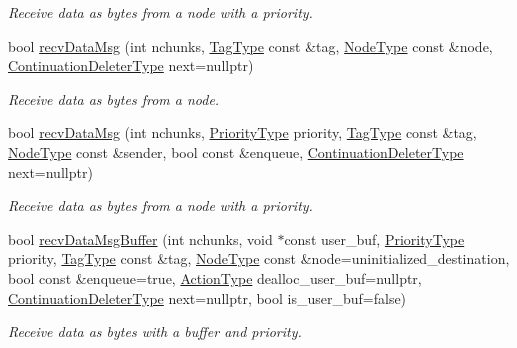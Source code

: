\begin{DoxyCompactItemize}
\begin{DoxyCompactList}\small\item\em Receive data as bytes from a node with a priority. \end{DoxyCompactList}\item 
bool \hyperlink{structvt_1_1messaging_1_1_active_messenger_a9dc244ad2e4fbb24a7bb0b0cd2ef0b61}{recv\+Data\+Msg} (int nchunks, \hyperlink{namespacevt_a84ab281dae04a52a4b243d6bf62d0e52}{Tag\+Type} const \&tag, \hyperlink{namespacevt_a866da9d0efc19c0a1ce79e9e492f47e2}{Node\+Type} const \&node, \hyperlink{namespacevt_a6de3bd201e2a040be9362d9d24d1e446}{Continuation\+Deleter\+Type} next=nullptr)
\begin{DoxyCompactList}\small\item\em Receive data as bytes from a node. \end{DoxyCompactList}\item 
bool \hyperlink{structvt_1_1messaging_1_1_active_messenger_a3e804443f73230399bcda8f14f069128}{recv\+Data\+Msg} (int nchunks, \hyperlink{namespacevt_a86bff9f556eb761b27fc8600d006ac04}{Priority\+Type} priority, \hyperlink{namespacevt_a84ab281dae04a52a4b243d6bf62d0e52}{Tag\+Type} const \&tag, \hyperlink{namespacevt_a866da9d0efc19c0a1ce79e9e492f47e2}{Node\+Type} const \&sender, bool const \&enqueue, \hyperlink{namespacevt_a6de3bd201e2a040be9362d9d24d1e446}{Continuation\+Deleter\+Type} next=nullptr)
\begin{DoxyCompactList}\small\item\em Receive data as bytes from a node with a priority. \end{DoxyCompactList}\item 
bool \hyperlink{structvt_1_1messaging_1_1_active_messenger_addd48e0a672831571151e7b7f4324376}{recv\+Data\+Msg\+Buffer} (int nchunks, void $\ast$const user\+\_\+buf, \hyperlink{namespacevt_a86bff9f556eb761b27fc8600d006ac04}{Priority\+Type} priority, \hyperlink{namespacevt_a84ab281dae04a52a4b243d6bf62d0e52}{Tag\+Type} const \&tag, \hyperlink{namespacevt_a866da9d0efc19c0a1ce79e9e492f47e2}{Node\+Type} const \&node=uninitialized\+\_\+destination, bool const \&enqueue=true, \hyperlink{namespacevt_ae0a5a7b18cc99d7b732cb4d44f46b0f3}{Action\+Type} dealloc\+\_\+user\+\_\+buf=nullptr, \hyperlink{namespacevt_a6de3bd201e2a040be9362d9d24d1e446}{Continuation\+Deleter\+Type} next=nullptr, bool is\+\_\+user\+\_\+buf=false)
\begin{DoxyCompactList}\small\item\em Receive data as bytes with a buffer and priority. \end{DoxyCompactList}\item 

\end{DoxyCompactItemize}
